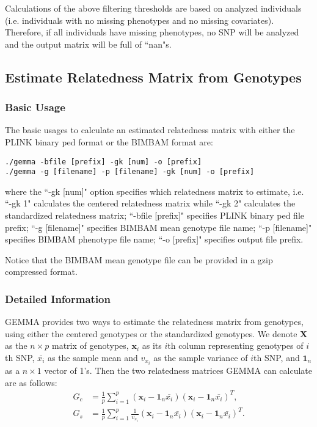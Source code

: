 \documentclass[11pt]{article}
\begin{document}
Calculations of the above filtering thresholds are based on analyzed individuals (i.e. individuals with no missing phenotypes and no missing covariates). Therefore, if all individuals have missing phenotypes, no SNP will be analyzed and the output matrix will be full of ``nan"s. 


\subsection{Estimate Relatedness Matrix from Genotypes}
\subsubsection{Basic Usage}
The basic usages to calculate an estimated relatedness matrix with either the PLINK binary ped format or the BIMBAM format are:
%
\begin{verbatim}
./gemma -bfile [prefix] -gk [num] -o [prefix]
./gemma -g [filename] -p [filename] -gk [num] -o [prefix]
\end{verbatim}
%
where the ``-gk [num]" option specifies which relatedness matrix to estimate, i.e. ``-gk 1" calculates the centered relatedness matrix while ``-gk 2" calculates the standardized relatedness matrix; ``-bfile [prefix]" specifies PLINK binary ped file prefix; ``-g [filename]" specifies BIMBAM mean genotype file name; ``-p [filename]" specifies BIMBAM phenotype file name; ``-o [prefix]" specifies output file prefix. 

Notice that the BIMBAM mean genotype file can be provided in a gzip compressed format.

\subsubsection{Detailed Information}

GEMMA provides two ways to estimate the relatedness matrix from genotypes, using either the centered genotypes or the standardized genotypes. We denote $\mathbf X$ as the $n\times p$ matrix of genotypes, $\mathbf x_i$ as its $i$th column representing genotypes of $i$th SNP, $\bar{x_i}$ as the sample mean and $v_{x_i}$ as the sample variance of $i$th SNP, and $\mathbf 1_n$ as a $n\times 1$ vector of 1's. Then the two relatedness matrices GEMMA can calculate are as follows:
%
\begin{align*}
G_c&=\frac{1}{p}\sum_{i=1}^p (\mathbf x_i-\mathbf 1_n \bar{x_i})(\mathbf x_i-\mathbf 1_n \bar{x_i})^T, \\
G_s&=\frac{1}{p}\sum_{i=1}^p \frac{1}{v_{x_i}}(\mathbf x_i-\mathbf 1_n \bar{x_i})(\mathbf x_i-\mathbf 1_n \bar{x_i})^T.
\end{align*}
%
\end{document}
